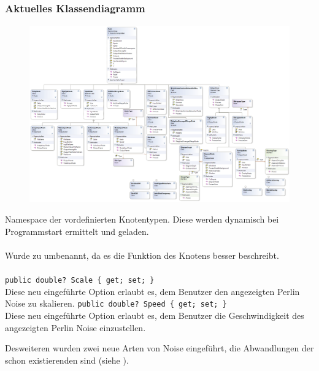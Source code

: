 \subsection{}

\subsubsection*{Aktuelles Klassendiagramm}
\begin{figure}[h!]
\begin{center}
\includegraphics[width=0.8\textheight,angle=90]{classdiagram/pipe-imp.png}
\end{center}
\end{figure}
Namespace der vordefinierten Knotentypen. Diese werden dynamisch bei Programmstart ermittelt und geladen.
\newpage

\paragraph{}
\begin{itemize}
	\change Wurde zu   umbenannt, da es die Funktion des Knotens besser beschreibt.
\end{itemize}

\paragraph{}
\begin{itemize}
	\add \verb!public double? Scale { get; set; }! \\
	Diese neu eingeführte Option erlaubt es, dem Benutzer den angezeigten Perlin Noise zu skalieren.
	\add \verb!public double? Speed { get; set; }! \\
	Diese neu eingeführte Option erlaubt es, dem Benutzer die Geschwindigkeit des angezeigten Perlin Noise einzustellen.
\end{itemize}
Desweiteren wurden zwei neue Arten von Noise eingeführt, die Abwandlungen der schon existierenden sind (siehe ).

